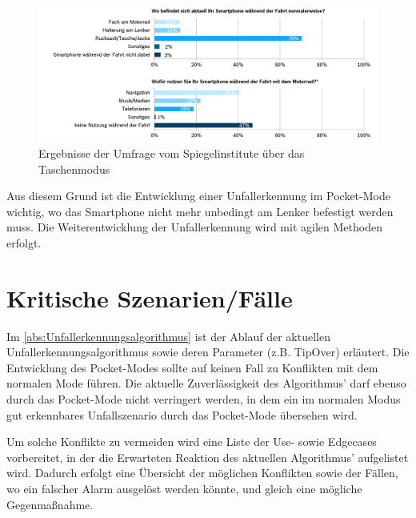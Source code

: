 

\begin{figure}[H]
	\centering
	\includegraphics[width=\linewidth]{Bilder/SpiegelUmfragePocketMode.png}
	\caption{Ergebnisse der Umfrage vom Spiegelinstitute über das Taschenmodus}
	\label{fig:CalimotoUmfragePocketMode}
\end{figure}

Aus diesem Grund ist die Entwicklung einer Unfallerkennung im Pocket-Mode wichtig, wo das Smartphone nicht mehr unbedingt am Lenker befestigt werden muss. Die Weiterentwicklung der Unfallerkennung wird mit agilen Methoden erfolgt.

\section{Kritische Szenarien/Fälle}
Im \autoref{abs:Unfallerkennungsalgorithmus} ist der Ablauf der aktuellen Unfallerkennungsalgorithmus sowie deren Parameter (z.B. TipOver) erläutert. Die Entwicklung des Pocket-Modes sollte auf keinen Fall zu Konflikten mit dem normalen Mode führen. Die aktuelle Zuverlässigkeit des Algorithmus' darf ebenso durch das Pocket-Mode nicht verringert werden, in dem ein im normalen Modus gut erkennbares Unfallszenario durch das Pocket-Mode übersehen wird.

Um solche Konflikte zu vermeiden wird eine Liste der Use- sowie Edgecases vorbereitet, in der die Erwarteten Reaktion des aktuellen Algorithmus' aufgelistet wird. Dadurch erfolgt eine Übersicht der möglichen Konflikten sowie der Fällen, wo ein falscher Alarm ausgelöst werden könnte, und gleich eine mögliche Gegenmaßnahme.

